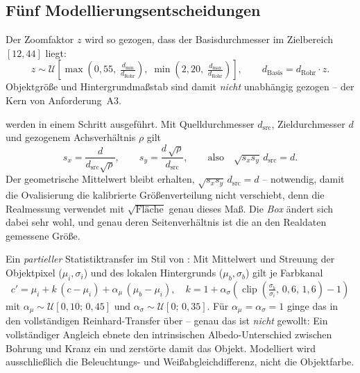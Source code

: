 \subsection{Fünf Modellierungsentscheidungen}

 Der Zoomfaktor $z$ wird so gezogen, dass der
Basisdurchmesser im Zielbereich $[12, 44]$\px{} liegt:
\begin{equation}
z \sim \mathcal{U}\!\left[\max\!\left(0{,}55,\;
\tfrac{d_{\min}}{d_{\text{Rohr}}}\right),\;
\min\!\left(2{,}20,\;\tfrac{d_{\max}}{d_{\text{Rohr}}}\right)\right],
\qquad d_{\text{Basis}} = d_{\text{Rohr}} \cdot z .
\label{eq:zoom}
\end{equation}
Objektgröße und Hintergrundmaßstab sind damit \emph{nicht} unabhängig gezogen --
der Kern von Anforderung~A3.

 werden in einem Schritt ausgeführt. Mit
Quelldurchmesser $d_{\text{src}}$, Zieldurchmesser $d$ und gezogenem
Achsverhältnis $\rho$ gilt
\begin{equation}
s_x = \frac{d}{d_{\text{src}}\sqrt{\rho}}, \qquad
s_y = \frac{d\,\sqrt{\rho}}{d_{\text{src}}},
\qquad\text{also}\quad \sqrt{s_x s_y}\, d_{\text{src}} = d .
\label{eq:oval}
\end{equation}
Der geometrische Mittelwert bleibt erhalten, $\sqrt{s_x s_y}\,d_{\text{src}} = d$
-- notwendig, damit die Ovalisierung die kalibrierte Größenverteilung nicht
verschiebt, denn die Realmessung verwendet mit $\sqrt{\text{Fläche}}$ genau
dieses Maß. Die \emph{Box} ändert sich dabei sehr wohl, und genau deren
Seitenverhältnis ist die an den Realdaten gemessene Größe.

 Ein \emph{partieller} Statistiktransfer im Stil von
\textcite{reinhard2001}: Mit Mittelwert und Streuung der Objektpixel
($\mu_i, \sigma_i$) und des lokalen Hintergrunds ($\mu_b, \sigma_b$) gilt je
Farbkanal
\begin{equation}
c' = \mu_i + k\,(c - \mu_i) + \alpha_\mu\,(\mu_b - \mu_i),
\quad
k = 1 + \alpha_\sigma\!\left(\operatorname{clip}\!\left(
\tfrac{\sigma_b}{\sigma_i},\, 0{,}6,\, 1{,}6\right) - 1\right)
\label{eq:harmonize}
\end{equation}
mit $\alpha_\mu \sim \mathcal{U}[0{,}10;\,0{,}45]$ und
$\alpha_\sigma \sim \mathcal{U}[0;\,0{,}35]$. Für
$\alpha_\mu = \alpha_\sigma = 1$ ginge das in den vollständigen
Reinhard-Transfer über -- genau das ist \emph{nicht} gewollt: Ein vollständiger
Angleich ebnete den intrinsischen Albedo-Unterschied zwischen Bohrung und Kranz
ein und zerstörte damit das Objekt. Modelliert wird ausschließlich die
Beleuchtungs- und Weißabgleichdifferenz, nicht die Objektfarbe.

